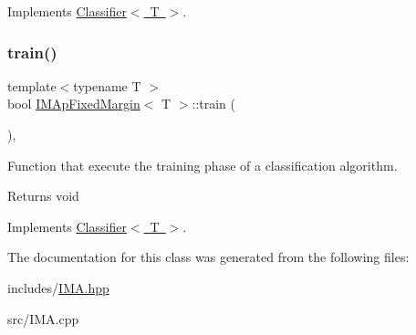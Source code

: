 Implements \mbox{\hyperlink{class_classifier_ab3b9544a8d9c3cbde8d5865c7e9be0fb}{Classifier$<$ T $>$}}.

\mbox{\label{class_i_m_ap_fixed_margin_a4d99742be5fe5a21b8ae6f99547a98c8}} 
\subsubsection{\texorpdfstring{train()}{train()}}
{\footnotesize\ttfamily template$<$typename T $>$ \\
bool \mbox{\hyperlink{class_i_m_ap_fixed_margin}{I\+M\+Ap\+Fixed\+Margin}}$<$ T $>$\+::train (\begin{DoxyParamCaption}{ }\end{DoxyParamCaption})\hspace{0.3cm}{\ttfamily [override]}, {\ttfamily [virtual]}}



Function that execute the training phase of a classification algorithm. 

\begin{DoxyReturn}{Returns}
void 
\end{DoxyReturn}


Implements \mbox{\hyperlink{class_classifier_a120849bfdfa3ba7a0388b32b2d76bf4f}{Classifier$<$ T $>$}}.



The documentation for this class was generated from the following files\+:\begin{DoxyCompactItemize}
\item 
includes/\mbox{\hyperlink{_i_m_a_8hpp}{I\+M\+A.\+hpp}}\item 
src/I\+M\+A.\+cpp\end{DoxyCompactItemize}
